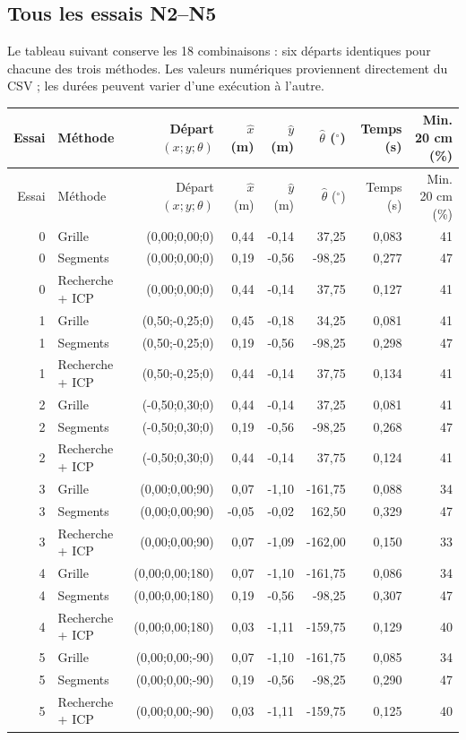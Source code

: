 \documentclass[11pt,a4paper]{article}
\begin{document}
\subsection{Tous les essais N2--N5}
Le tableau suivant conserve les 18 combinaisons : six départs identiques
pour chacune des trois méthodes. Les valeurs numériques proviennent
directement du CSV ; les durées peuvent varier d'une exécution à l'autre.
\begin{center}\small\setlength{\tabcolsep}{3pt}
\begin{longtable}{rlrrrrrr}
\toprule Essai & Méthode & Départ $(x;y;\theta)$ & $\hat x$ (m) &
$\hat y$ (m) & $\hat\theta$ ($^\circ$) & Temps (s) & Min. 20 cm (\%)\\\midrule
\endfirsthead
\toprule Essai & Méthode & Départ $(x;y;\theta)$ & $\hat x$ (m) &
$\hat y$ (m) & $\hat\theta$ ($^\circ$) & Temps (s) & Min. 20 cm (\%)\\\midrule
\endhead
0 & Grille & (0,00;0,00;0) & 0,44 & -0,14 & 37,25 & 0,083 & 41 \\
0 & Segments & (0,00;0,00;0) & 0,19 & -0,56 & -98,25 & 0,277 & 47 \\
0 & Recherche + ICP & (0,00;0,00;0) & 0,44 & -0,14 & 37,75 & 0,127 & 41 \\
1 & Grille & (0,50;-0,25;0) & 0,45 & -0,18 & 34,25 & 0,081 & 41 \\
1 & Segments & (0,50;-0,25;0) & 0,19 & -0,56 & -98,25 & 0,298 & 47 \\
1 & Recherche + ICP & (0,50;-0,25;0) & 0,44 & -0,14 & 37,75 & 0,134 & 41 \\
2 & Grille & (-0,50;0,30;0) & 0,44 & -0,14 & 37,25 & 0,081 & 41 \\
2 & Segments & (-0,50;0,30;0) & 0,19 & -0,56 & -98,25 & 0,268 & 47 \\
2 & Recherche + ICP & (-0,50;0,30;0) & 0,44 & -0,14 & 37,75 & 0,124 & 41 \\
3 & Grille & (0,00;0,00;90) & 0,07 & -1,10 & -161,75 & 0,088 & 34 \\
3 & Segments & (0,00;0,00;90) & -0,05 & -0,02 & 162,50 & 0,329 & 47 \\
3 & Recherche + ICP & (0,00;0,00;90) & 0,07 & -1,09 & -162,00 & 0,150 & 33 \\
4 & Grille & (0,00;0,00;180) & 0,07 & -1,10 & -161,75 & 0,086 & 34 \\
4 & Segments & (0,00;0,00;180) & 0,19 & -0,56 & -98,25 & 0,307 & 47 \\
4 & Recherche + ICP & (0,00;0,00;180) & 0,03 & -1,11 & -159,75 & 0,129 & 40 \\
5 & Grille & (0,00;0,00;-90) & 0,07 & -1,10 & -161,75 & 0,085 & 34 \\
5 & Segments & (0,00;0,00;-90) & 0,19 & -0,56 & -98,25 & 0,290 & 47 \\
5 & Recherche + ICP & (0,00;0,00;-90) & 0,03 & -1,11 & -159,75 & 0,125 & 40 \\
\bottomrule
\end{longtable}
\end{center}
\end{document}
